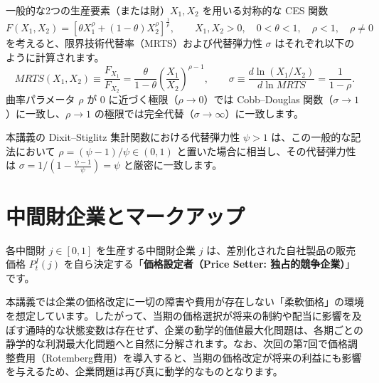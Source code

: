 \documentclass[
  japanese,
  lualatex,
  ja=standard,
  12pt,
  a4paper]{ltjsarticle}
\begin{document}
\begin{tcolorbox}[enhanced jigsaw, arc=.35mm, bottomrule=.15mm, bottomtitle=1mm, breakable, colback=white, colbacktitle=quarto-callout-note-color!10!white, colframe=quarto-callout-note-color-frame, coltitle=black, left=2mm, leftrule=.75mm, opacityback=0, opacitybacktitle=0.6, rightrule=.15mm, title=\textcolor{quarto-callout-note-color}{\faInfo}\hspace{0.5em}{2投入CESによる代替弾力性の確認}, titlerule=0mm, toprule=.15mm, toptitle=1mm]

一般的な2つの生産要素（または財）\(X_1, X_2\) を用いる対称的な CES 関数
\[
F(X_1, X_2) = \left[ \theta X_1^\rho + (1-\theta) X_2^\rho \right]^{\frac{1}{\rho}}, \qquad X_1, X_2 > 0, \quad 0 < \theta < 1, \quad \rho < 1, \quad \rho \neq 0
\] を考えると、限界技術代替率（MRTS）および代替弾力性 \(\sigma\)
はそれぞれ以下のように計算されます。 \[
MRTS(X_1, X_2) \equiv \frac{F_{X_1}}{F_{X_2}} = \frac{\theta}{1-\theta} \left( \frac{X_1}{X_2} \right)^{\rho - 1}, \qquad \sigma \equiv \frac{d\ln(X_1/X_2)}{d\ln MRTS} = \frac{1}{1-\rho}.
\] 曲率パラメータ \(\rho\) が \(0\) に近づく極限（\(\rho \to 0\)）では
Cobb--Douglas 関数（\(\sigma \to 1\)）に一致し、\(\rho \to 1\)
の極限では完全代替（\(\sigma \to \infty\)）に一致します。

本講義の Dixit--Stiglitz 集計関数における代替弾力性 \(\psi > 1\)
は、この一般的な記法において \(\rho = (\psi - 1)/\psi \in (0, 1)\)
と置いた場合に相当し、その代替弾力性は
\(\sigma = 1/(1 - \frac{\psi-1}{\psi}) = \psi\) と厳密に一致します。

\end{tcolorbox}

\section{中間財企業とマークアップ}\label{ux4e2dux9593ux8ca1ux4f01ux696dux3068ux30deux30fcux30afux30a2ux30c3ux30d7}

各中間財 \(j \in [0, 1]\) を生産する中間財企業 \(j\)
は、差別化された自社製品の販売価格 \(P_t^I(j)\)
を自ら決定する「\textbf{価格設定者（Price Setter:
独占的競争企業）}」です。

本講義では企業の価格改定に一切の障害や費用が存在しない「柔軟価格」の環境を想定しています。したがって、当期の価格選択が将来の制約や配当に影響を及ぼす通時的な状態変数は存在せず、企業の動学的価値最大化問題は、各期ごとの静学的な利潤最大化問題へと自然に分解されます。なお、次回の第7回で価格調整費用（Rotemberg費用）を導入すると、当期の価格改定が将来の利益にも影響を与えるため、企業問題は再び真に動学的なものとなります。
\end{document}
